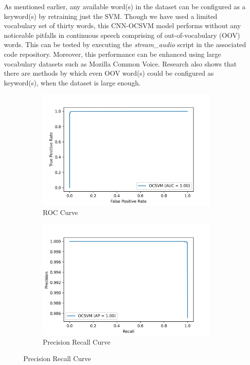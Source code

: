 \documentclass[a4paper]{article}
\begin{document}
As mentioned earlier, any available word(s) in the dataset can be configured as a keyword(s) by retraining just the SVM. Though we have used a limited vocabulary set of thirty words, this CNN-OCSVM model performs without any noticeable pitfalls in continuous speech comprising of out-of-vocabulary (OOV) words. This can be tested by executing the \textit{stream\_audio} script in the associated code repository. Moreover, this performance can be enhanced using large vocabulary datasets such as Mozilla Common Voice. Research also shows that there are methods by which even OOV word(s) could be configured as keyword(s), when the dataset is large enough.

\begin{figure}
	\begin{subfigure}[b]{0.49\columnwidth}
		\includegraphics[width=\linewidth]{../results/ROC.png}
		\caption{ROC Curve}
		\label{fig:ROC}
	\end{subfigure}
	\hfill %
	\begin{subfigure}[b]{0.49\columnwidth}
		\includegraphics[width=\linewidth]{../results/PR.png}
		\caption{Precision Recall Curve}
		\label{fig:PR}
	\end{subfigure}
\end{figure}
\end{document}
